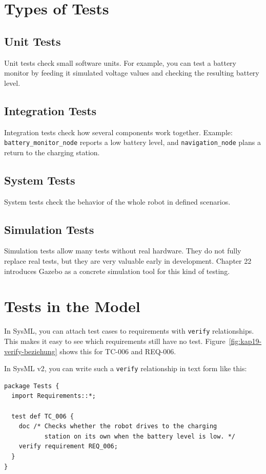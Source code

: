 \section{Types of Tests}
\subsection{Unit Tests}
Unit tests check small software units. For example, you can test a battery monitor by feeding it simulated voltage values and checking the resulting battery level.

\subsection{Integration Tests}
Integration tests check how several components work together. Example: \texttt{battery\_monitor\_node} reports a low battery level, and \texttt{navigation\_node} plans a return to the charging station.

\subsection{System Tests}
System tests check the behavior of the whole robot in defined scenarios.

\subsection{Simulation Tests}
Simulation tests allow many tests without real hardware. They do not fully replace real tests, but they are very valuable early in development. Chapter 22 introduces Gazebo as a concrete simulation tool for this kind of testing.

\section{Tests in the Model}
In SysML, you can attach test cases to requirements with \texttt{verify} relationships. This makes it easy to see which requirements still have no test. Figure~\ref{fig:kap19-verify-beziehung} shows this for TC-006 and REQ-006.

In SysML v2, you can write such a \texttt{verify} relationship in text form like this:

\begin{lstlisting}
package Tests {
  import Requirements::*;

  test def TC_006 {
    doc /* Checks whether the robot drives to the charging
           station on its own when the battery level is low. */
    verify requirement REQ_006;
  }
}
\end{lstlisting}

